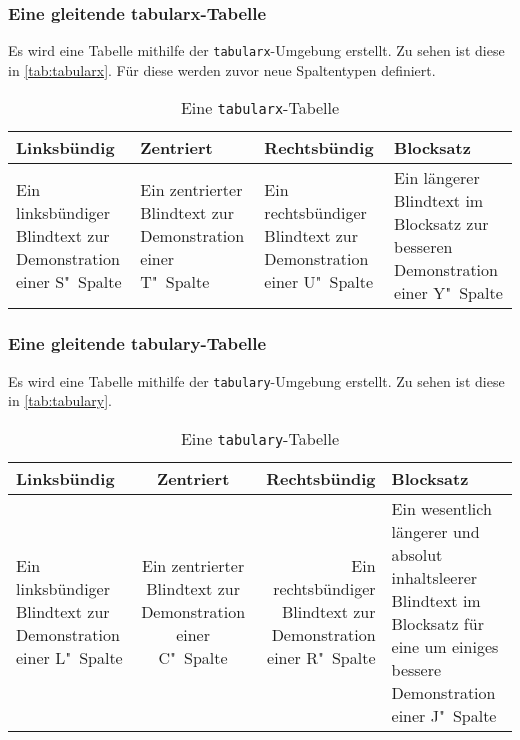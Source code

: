 \documentclass[english,ngerman]{tudscrreprt}
\begin{document}
\subsubsection{Eine gleitende tabularx-Tabelle}
Es wird eine Tabelle mithilfe der \texttt{tabularx}-Umgebung erstellt.
Zu sehen ist diese in \autoref{tab:tabularx}. Für diese werden zuvor
neue Spaltentypen definiert.
\begin{table}
\begin{tabularx}{\textwidth}{@{}STUY@{}}
\toprule
\textbf{Linksbündig} & \textbf{Zentriert} &
\textbf{Rechtsbündig} & \textbf{Blocksatz} \tabularnewline
\midrule
Ein linksbündiger Blindtext zur Demonstration einer S"~Spalte &
Ein zentrierter Blindtext zur Demonstration einer T"~Spalte &
Ein rechtsbündiger Blindtext zur Demonstration einer U"~Spalte &
Ein längerer Blindtext im Blocksatz zur besseren Demonstration
einer Y"~Spalte\tabularnewline
\bottomrule
\end{tabularx}
\caption{Eine \texttt{tabularx}-Tabelle}\label{tab:tabularx}
\end{table}
\subsubsection{Eine gleitende tabulary-Tabelle}
Es wird eine Tabelle mithilfe der \texttt{tabulary}-Umgebung erstellt.
Zu sehen ist diese in \autoref{tab:tabulary}.
\begin{table}
\begin{tabulary}{\textwidth}{@{}LCRJ@{}}
\toprule
\textbf{Linksbündig} & \textbf{Zentriert} &
\textbf{Rechtsbündig} & \textbf{Blocksatz} \tabularnewline
\midrule
Ein linksbündiger Blindtext zur Demonstration einer L"~Spalte &
Ein zentrierter Blindtext zur Demonstration einer C"~Spalte &
Ein rechtsbündiger Blindtext zur Demonstration einer R"~Spalte &
Ein wesentlich längerer und absolut inhaltsleerer Blindtext im
Blocksatz für eine um einiges bessere Demonstration einer J"~Spalte
\tabularnewline
\bottomrule
\end{tabulary}
\caption{Eine \texttt{tabulary}-Tabelle}\label{tab:tabulary}
\end{table}
\end{document}
